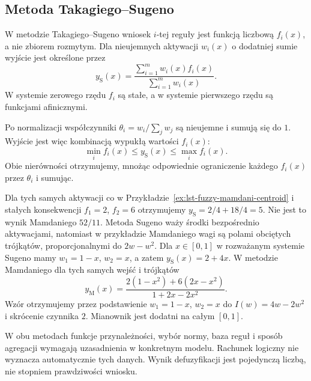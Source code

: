 \subsection{Metoda Takagiego--Sugeno}
\begin{definicja}\label{def:lst-fuzzy-sugeno}
W metodzie Takagiego--Sugeno wniosek $i$-tej reguły
jest funkcją liczbową $f_i(x)$, a nie zbiorem rozmytym.
Dla nieujemnych aktywacji $w_i(x)$ o dodatniej sumie
wyjście jest określone przez
\[
 y_{\mathrm S}(x)=
 \frac{\sum_{i=1}^m w_i(x)f_i(x)}{\sum_{i=1}^m w_i(x)}.
\]
W systemie zerowego rzędu $f_i$ są stałe,
a w systemie pierwszego rzędu są funkcjami afinicznymi.
\end{definicja}
Po normalizacji współczynniki
$\theta_i=w_i/\sum_jw_j$ są nieujemne i sumują się do $1$.
Wyjście jest więc kombinacją wypukłą wartości $f_i(x)$:
\[
 \min_i f_i(x)\leq y_{\mathrm S}(x)\leq\max_i f_i(x).
\]
Obie nierówności otrzymujemy, mnożąc odpowiednie
ograniczenie każdego $f_i(x)$ przez $\theta_i$ i sumując.

\begin{przyklad}\label{ex:lst-fuzzy-sugeno-comparison}
Dla tych samych aktywacji co w
Przykładzie~\ref{ex:lst-fuzzy-mamdani-centroid}
i stałych konsekwencji $f_1=2$, $f_2=6$ otrzymujemy
$y_{\mathrm S}=2/4+18/4=5$.
Nie jest to wynik Mamdaniego $52/11$.
Metoda Sugeno waży środki bezpośrednio aktywacjami,
natomiast w przykładzie Mamdaniego wagi są polami
obciętych trójkątów, proporcjonalnymi do $2w-w^2$.
Dla $x\in[0,1]$ w rozważanym systemie Sugeno mamy
$w_1=1-x$, $w_2=x$, a zatem $y_{\mathrm S}(x)=2+4x$.
W metodzie Mamdaniego dla tych samych wejść i trójkątów
\[
 y_{\mathrm M}(x)=
 \frac{2(1-x^2)+6(2x-x^2)}{1+2x-2x^2}.
\]
Wzór otrzymujemy przez podstawienie $w_1=1-x$, $w_2=x$
do $I(w)=4w-2w^2$ i skrócenie czynnika $2$.
Mianownik jest dodatni na całym $[0,1]$.
\begin{center}
\end{center}
\end{przyklad}

\begin{uwaga}
W obu metodach funkcje przynależności, wybór normy,
baza reguł i sposób agregacji wymagają uzasadnienia
w konkretnym modelu. Rachunek logiczny nie wyznacza
automatycznie tych danych. Wynik defuzyfikacji jest
pojedynczą liczbą, nie stopniem prawdziwości wniosku.
\end{uwaga}
